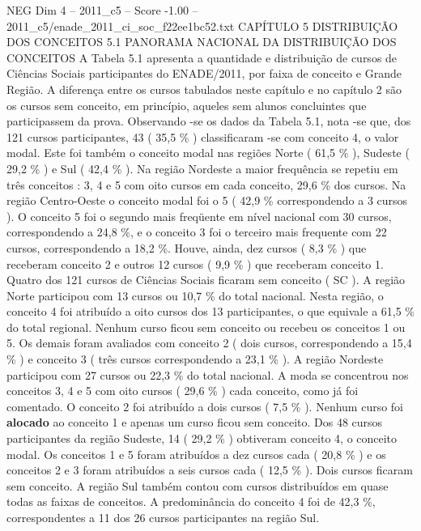\begin{textsample}{NEG Dim 4 – 2011\_c5 – Score -1.00 – 2011\_c5/enade\_2011\_ci\_soc\_f22ee1bc52.txt}  \label{ex:f4_neg_112}
CAPÍTULO 5 DISTRIBUIÇÃO DOS CONCEITOS 5.1 PANORAMA NACIONAL DA DISTRIBUIÇÃO DOS CONCEITOS A Tabela 5.1 apresenta a quantidade e distribuição de cursos de Ciências Sociais participantes do ENADE/2011, por faixa de conceito e Grande Região.
A diferença entre os cursos tabulados neste capítulo e no capítulo 2 são os cursos sem conceito, em princípio, aqueles sem alunos concluintes que participassem da prova.
Observando -se os dados da Tabela 5.1, nota -se que, dos 121 cursos participantes, 43 ( 35,5 \% ) classificaram -se com conceito 4, o valor modal.
Este foi também o conceito modal nas regiões Norte ( 61,5 \% ), Sudeste ( 29,2 \% ) e Sul ( 42,4 \% ).
Na região Nordeste a maior frequência se repetiu em três conceitos : 3, 4 e 5 com oito cursos em cada conceito, 29,6 \% dos cursos.
Na região Centro-Oeste o conceito modal foi o 5 ( 42,9 \% correspondendo a 3 cursos ).
O conceito 5 foi o segundo mais freqüente em nível nacional com 30 cursos, correspondendo a 24,8 \%, e o conceito 3 foi o terceiro mais frequente com 22 cursos, correspondendo a 18,2 \%.
Houve, ainda, dez cursos ( 8,3 \% ) que receberam conceito 2 e outros 12 cursos ( 9,9 \% ) que receberam conceito 1.
Quatro dos 121 cursos de Ciências Sociais ficaram sem conceito ( SC ).
A região Norte participou com 13 cursos ou 10,7 \% do total nacional.
Nesta região, o conceito 4 foi atribuído a oito cursos dos 13 participantes, o que equivale a 61,5 \% do total regional.
Nenhum curso ficou sem conceito ou recebeu os conceitos 1 ou 5.
Os demais foram avaliados com conceito 2 ( dois cursos, correspondendo a 15,4 \% ) e conceito 3 ( três cursos correspondendo a 23,1 \% ).
A região Nordeste participou com 27 cursos ou 22,3 \% do total nacional.
A moda se concentrou nos conceitos 3, 4 e 5 com oito cursos ( 29,6 \% ) cada conceito, como já foi comentado.
O conceito 2 foi atribuído a dois cursos ( 7,5 \% ).
Nenhum curso foi \textbf{alocado} ao conceito 1 e apenas um curso ficou sem conceito.
Dos 48 cursos participantes da região Sudeste, 14 ( 29,2 \% ) obtiveram conceito 4, o conceito modal.
Os conceitos 1 e 5 foram atribuídos a dez cursos cada ( 20,8 \% ) e os conceitos 2 e 3 foram atribuídos a seis cursos cada ( 12,5 \% ).
Dois cursos ficaram sem conceito.
A região Sul também contou com cursos distribuídos em quase todas as faixas de conceitos.
A predominância do conceito 4 foi de 42,3 \%, correspondentes a 11 dos 26 cursos participantes na região Sul.

\end{textsample}
